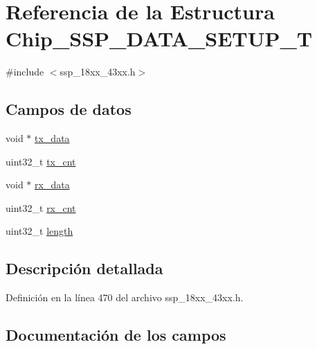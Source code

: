 \hypertarget{struct_chip___s_s_p___d_a_t_a___s_e_t_u_p___t}{}\section{Referencia de la Estructura Chip\+\_\+\+S\+S\+P\+\_\+\+D\+A\+T\+A\+\_\+\+S\+E\+T\+U\+P\+\_\+T}
\label{struct_chip___s_s_p___d_a_t_a___s_e_t_u_p___t}


{\ttfamily \#include $<$ssp\+\_\+18xx\+\_\+43xx.\+h$>$}

\subsection*{Campos de datos}
\begin{DoxyCompactItemize}
\item 
void $\ast$ \hyperlink{struct_chip___s_s_p___d_a_t_a___s_e_t_u_p___t_ac5b2b9db8286b9c85c956556cfa42b92}{tx\+\_\+data}
\item 
uint32\+\_\+t \hyperlink{struct_chip___s_s_p___d_a_t_a___s_e_t_u_p___t_a0441520d3f5ed5b07bfb4889dd495b86}{tx\+\_\+cnt}
\item 
void $\ast$ \hyperlink{struct_chip___s_s_p___d_a_t_a___s_e_t_u_p___t_a145057319bd95286db0e0ad0e635f93f}{rx\+\_\+data}
\item 
uint32\+\_\+t \hyperlink{struct_chip___s_s_p___d_a_t_a___s_e_t_u_p___t_a3b1e23a496d25dd87f7b1f223fe0d60c}{rx\+\_\+cnt}
\item 
uint32\+\_\+t \hyperlink{struct_chip___s_s_p___d_a_t_a___s_e_t_u_p___t_aebb70c2aab3407a9f05334c47131a43b}{length}
\end{DoxyCompactItemize}


\subsection{Descripción detallada}


Definición en la línea 470 del archivo ssp\+\_\+18xx\+\_\+43xx.\+h.



\subsection{Documentación de los campos}
